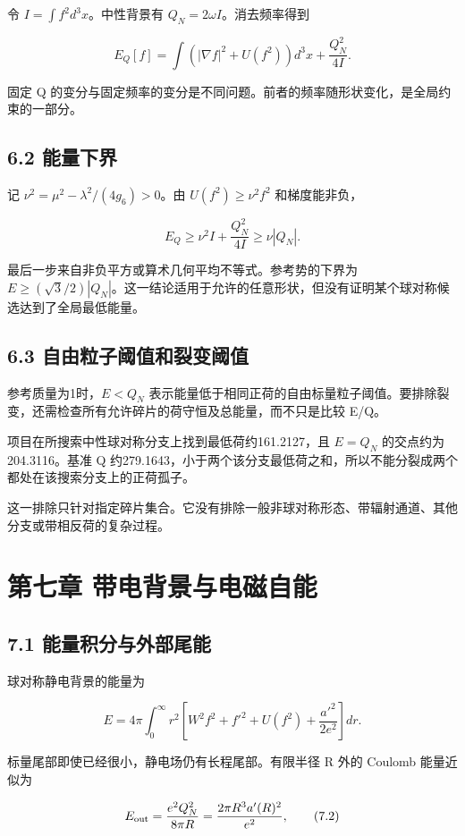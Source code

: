 \documentclass[UTF8,fontset=fandol,11pt]{ctexart}
\begin{document}
令 \(I=\int f^2d^3x\)。中性背景有 \(Q_N=2\omega I\)。消去频率得到

\[
E_Q[f]=\int(|\nabla f|^2+U(f^2))d^3x+\frac{Q_N^2}{4I}.
\tag{6.1}
\]

固定 Q 的变分与固定频率的变分是不同问题。前者的频率随形状变化，是全局约束的一部分。

\subsection*{6.2 能量下界}

记 \(\nu^2=\mu^2-\lambda^2/(4g_6)>0\)。由 \(U(f^2)\geq\nu^2f^2\) 和梯度能非负，

\[
E_Q\geq\nu^2 I+\frac{Q_N^2}{4I}\geq\nu|Q_N|.
\tag{6.2}
\]

最后一步来自非负平方或算术几何平均不等式。参考势的下界为 \(E\geq(\sqrt3/2)|Q_N|\)。这一结论适用于允许的任意形状，但没有证明某个球对称候选达到了全局最低能量。

\subsection*{6.3 自由粒子阈值和裂变阈值}

参考质量为1时，\(E<Q_N\) 表示能量低于相同正荷的自由标量粒子阈值。要排除裂变，还需检查所有允许碎片的荷守恒及总能量，而不只是比较 E/Q。

项目在所搜索中性球对称分支上找到最低荷约161.2127，且 \(E=Q_N\) 的交点约为204.3116。基准 Q 约279.1643，小于两个该分支最低荷之和，所以不能分裂成两个都处在该搜索分支上的正荷孤子。

这一排除只针对指定碎片集合。它没有排除一般非球对称形态、带辐射通道、其他分支或带相反荷的复杂过程。

\section*{第七章 带电背景与电磁自能}

\subsection*{7.1 能量积分与外部尾能}

球对称静电背景的能量为

\[
E=4\pi\int_0^\infty r^2\left[W^2f^2+f'^2+U(f^2)
+\frac{a'^2}{2e^2}\right]dr.
\tag{7.1}
\]

标量尾部即使已经很小，静电场仍有长程尾部。有限半径 R 外的 Coulomb 能量近似为

\[
E_{\rm out}=\frac{e^2Q_N^2}{8\pi R}
=\frac{2\pi R^3a'(R)^2}{e^2},
\tag{7.2}
\]
\end{document}
